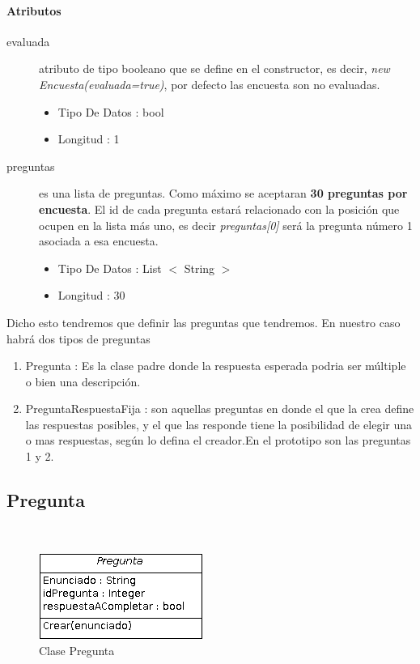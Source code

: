 \documentclass{article}
\begin{document}
\paragraph{\large{Atributos}}
\begin{description}
\item[evaluada] atributo de tipo booleano que se define en el constructor, es decir, \textit{new Encuesta(evaluada=true)}, por defecto las encuesta son no evaluadas.
\begin{itemize}
\item Tipo De Datos : bool
\item Longitud : 1
\end{itemize}
\item[preguntas] es una lista de preguntas. Como m\'aximo se aceptaran \textbf{30 preguntas por encuesta}. El id de cada pregunta estar\'a relacionado con la posici\'on que ocupen en la lista m\'as uno, es decir \textit{preguntas[0]} ser\'a la pregunta n\'umero 1 asociada a esa encuesta. 
\begin{itemize}
\item Tipo De Datos : List $<$ String $>$
\item Longitud : 30
\end{itemize}
\end{description}

Dicho esto tendremos que definir las preguntas que tendremos. En nuestro caso habr\'a dos tipos de preguntas
\begin{enumerate}
\item Pregunta : Es la clase padre donde la respuesta esperada podria ser m\'ultiple o bien una descripci\'on.
\item PreguntaRespuestaFija : son aquellas preguntas en donde el que la crea define las respuestas posibles, y el que las responde tiene la posibilidad de elegir una o mas respuestas, seg\'un lo defina el creador.En el prototipo son las preguntas 1 y 2.
\end{enumerate}
\subsection{Pregunta} \


\begin{figure}[h]
\centering
\includegraphics[scale=0.8]{Pregunta}

\caption{Clase Pregunta}
\end{figure}
\end{document}
